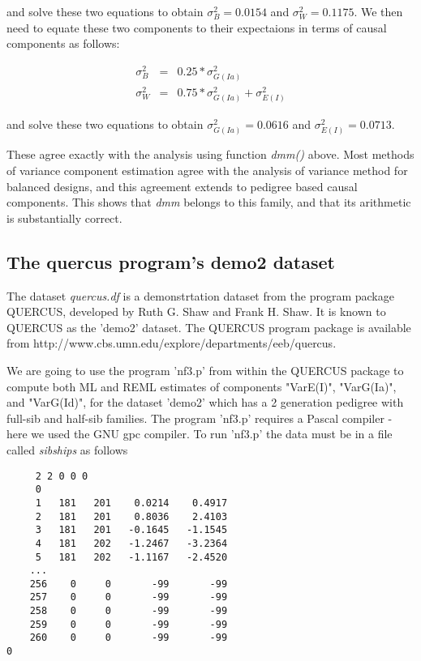 \documentclass[titlepage]{article}  %
\begin{document}
and solve these two equations to obtain $\sigma^{2}_{B} = 0.0154$ and $\sigma^{2}_{W} = 0.1175$. We then need to equate these two components to their expectaions in terms of causal components as follows:

\begin{eqnarray*}
\sigma^{2}_{B} & = & 0.25 * \sigma^{2}_{G(Ia)} \\
\sigma^{2}_{W} & = & 0.75 * \sigma^{2}_{G(Ia)} + \sigma^{2}_{E(I)}
\end{eqnarray*}

and solve these two equations to obtain $\sigma^{2}_{G(Ia)} = 0.0616$ and $\sigma^{2}_{E(I)} = 0.0713$.

These agree exactly with the analysis using function {\em dmm()} above. Most methods of variance component estimation agree with the analysis of variance method for balanced designs, and this agreement extends to pedigree based causal components. This shows that {\em dmm} belongs to this family, and that its arithmetic is substantially correct.

\clearpage
\subsection{The quercus program's demo2 dataset}
 The dataset {\em quercus.df} is a demonstrtation dataset from the program package QUERCUS, developed by Ruth G. Shaw and Frank H. Shaw. It is known to QUERCUS as the 'demo2' dataset. The QUERCUS program package is available from http://www.cbs.umn.edu/explore/departments/eeb/quercus. 

 We are going to use the program 'nf3.p' from within the QUERCUS package to compute both ML and REML estimates of components "VarE(I)", "VarG(Ia)", and "VarG(Id)", for the dataset 'demo2' which has a 2 generation pedigree with full-sib and half-sib families. The program 'nf3.p' requires a Pascal compiler - here we used the GNU gpc compiler. To run 'nf3.p' the data must be in a file called {\em sibships} as follows

\begin{verbatim}
     2 2 0 0 0
     0
     1   181   201    0.0214    0.4917
     2   181   201    0.8036    2.4103
     3   181   201   -0.1645   -1.1545
     4   181   202   -1.2467   -3.2364
     5   181   202   -1.1167   -2.4520
    ...
    256    0     0       -99       -99
    257    0     0       -99       -99
    258    0     0       -99       -99
    259    0     0       -99       -99
    260    0     0       -99       -99
0
\end{verbatim}
\end{document}
